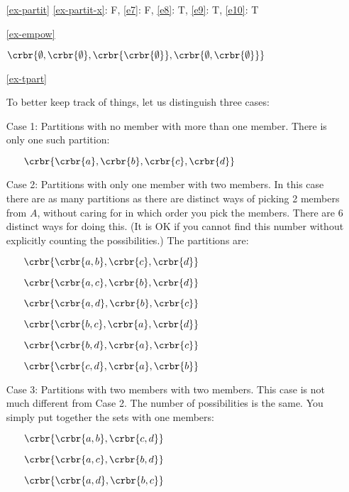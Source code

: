 \documentclass[11pt]{article}
\begin{document}
\begin{enumerate}
\item[\ref{ex-partit}]\hypertarget{ex-partit-sol}{}
\ref{ex-partit-x}: F,
\ref{e7}: F, 
\ref{e8}: T, 
\ref{e9}: T, 
\ref{e10}: T 


\item[\ref{ex-empow}]\hypertarget{ex-empow-sol}{}

$\crbr{\emptyset,
\crbr{\emptyset},
\crbr{\crbr{\emptyset}},
\crbr{\emptyset,\crbr{\emptyset}}}$


\item[\ref{ex-tpart}]\hypertarget{ex-tpart-sol}{}

To better keep track of things, let us distinguish three cases:

Case 1: Partitions with no member with more than one member. There is only one
such partition:

\begin{itemize}

\item[] $\crbr{\crbr{a},\crbr{b},\crbr{c},\crbr{d}}$

\end{itemize}

Case 2: Partitions with only one member with two members. In this case there are
as many partitions as there are distinct ways of picking 2 members from $A$,
without caring for in which order you pick the members. There are 6 distinct
ways for doing this. (It is OK if you cannot find this number without explicitly
counting the possibilities.) The partitions are:

\begin{itemize}
\item[] $\crbr{\crbr{a,b},\crbr{c},\crbr{d}}$
\item[] $\crbr{\crbr{a,c},\crbr{b},\crbr{d}}$
\item[] $\crbr{\crbr{a,d},\crbr{b},\crbr{c}}$
\item[] $\crbr{\crbr{b,c},\crbr{a},\crbr{d}}$
\item[] $\crbr{\crbr{b,d},\crbr{a},\crbr{c}}$
\item[] $\crbr{\crbr{c,d},\crbr{a},\crbr{b}}$
\end{itemize}

Case 3: Partitions with two members with two members. This case is not much
different from Case 2. The number of possibilities is the same. You simply put
together the sets with one members: 

\begin{itemize}
\item[] $\crbr{\crbr{a,b},\crbr{c,d}}$
\item[] $\crbr{\crbr{a,c},\crbr{b,d}}$
\item[] $\crbr{\crbr{a,d},\crbr{b,c}}$
\end{itemize}


\end{enumerate}
\end{document}
